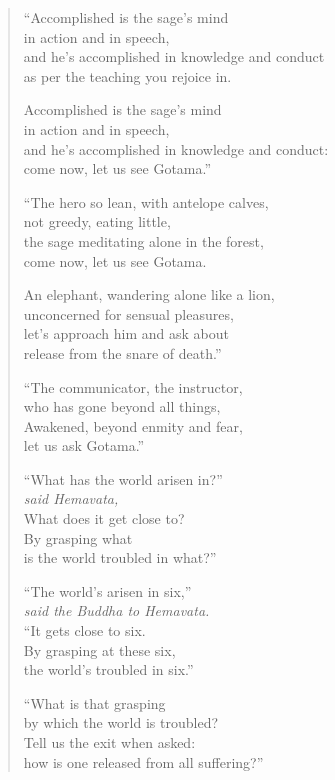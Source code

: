 \documentclass[12pt,openany]{book}%
\newcommand*{\scspeaker}[1]{\hspace{2em}\textit{#1}}
\begin{document}
\begin{verse}
“Accomplished is the sage’s mind \\
in action and in speech, \\
and he’s accomplished in knowledge and conduct \\
as per the teaching you rejoice in. 

Accomplished is the sage’s mind \\
in action and in speech, \\
and he’s accomplished in knowledge and conduct: \\
come now, let us see Gotama.” 

“The hero so lean, with antelope calves, \\
not greedy, eating little, \\
the sage meditating alone in the forest, \\
come now, let us see Gotama. 

An elephant, wandering alone like a lion, \\
unconcerned for sensual pleasures, \\
let’s approach him and ask about \\
release from the snare of death.” 

“The communicator, the instructor, \\
who has gone beyond all things, \\
Awakened, beyond enmity and fear, \\
let us ask Gotama.” 

“What has the world arisen in?” \\
\scspeaker{said Hemavata, }\\
What does it get close to? \\
By grasping what \\
is the world troubled in what?” 

“The world’s arisen in six,” \\
\scspeaker{said the Buddha to Hemavata. }\\
“It gets close to six. \\
By grasping at these six, \\
the world’s troubled in six.” 

“What is that grasping \\
by which the world is troubled? \\
Tell us the exit when asked: \\
how is one released from all suffering?” 


\end{verse}
\end{document}
